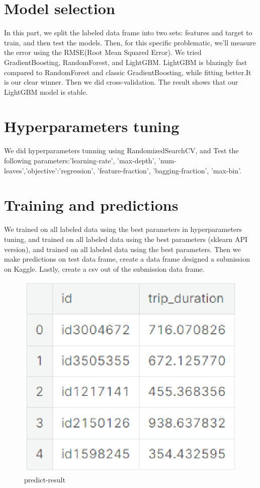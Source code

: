 \section{Model selection} \label{sec-Model selection}

In this part, we split the labeled data frame into two sets: features and target to train, and then test the models. Then, for this specific problematic, we'll measure the error using the RMSE(Root Mean Squared Error). We tried GradientBoosting, RandomForest, and LightGBM. LightGBM is blazingly fast compared to RandomForest and classic GradientBoosting, while fitting better.It is our clear winner. Then we did cross-validation. The result shows that our LightGBM model is stable.

\section{Hyperparameters tuning} \label{sec-Hyperparameters tuning}
We did hyperparameters tunning using RandomizedSearchCV, and Test the following parameters:'learning-rate', 'max-depth', 'num-leaves','objective':'regression', 'feature-fraction', 'bagging-fraction', 'max-bin'.
\section{Training and predictions}
We trained on all labeled data using the best parameters in hyperparameters tuning, and trained on all labeled data using the best parameters (sklearn API version), and trained on all labeled data using the best parameters. Then we make predictions on test data frame, create a data frame designed a submission on Kaggle.
Lastly, create a csv out of the submission data frame.
\begin{figure}[h]
	\centering
	\includegraphics[scale=0.3]{predict_result.eps}
	\caption{predict-result}
\end{figure}



